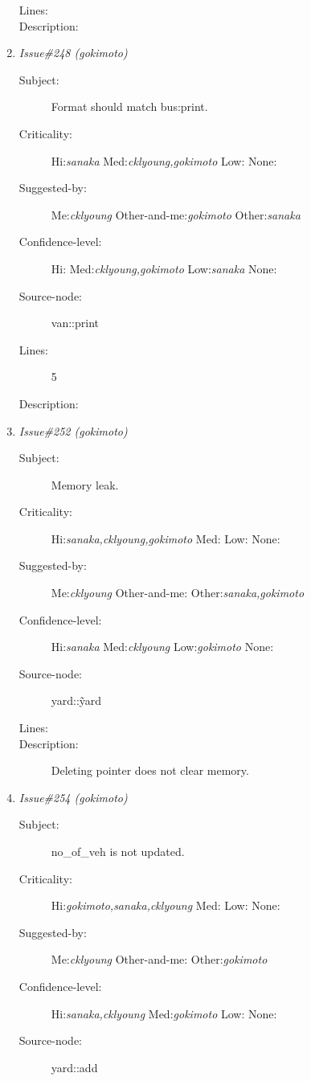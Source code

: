 \begin{enumerate}
\begin{description}
\item [Lines:] 

\item [Description:] 
\end{description}
\item {\it Issue\#248 (gokimoto)}
\begin{description}
\item [Subject:] Format should match bus:print.
\item [Criticality:] Hi:{\it sanaka} Med:{\it cklyoung,gokimoto} Low:{\it } None:{\it }
\item [Suggested-by:] Me:{\it cklyoung} Other-and-me:{\it gokimoto} Other:{\it sanaka}
\item [Confidence-level:] Hi:{\it } Med:{\it cklyoung,gokimoto} Low:{\it sanaka} None:{\it }
\item [Source-node:] van::print

\item [Lines:] 5

\item [Description:] 
\end{description}
\item {\it Issue\#252 (gokimoto)}
\begin{description}
\item [Subject:] Memory leak.
\item [Criticality:] Hi:{\it sanaka,cklyoung,gokimoto} Med:{\it } Low:{\it } None:{\it }
\item [Suggested-by:] Me:{\it cklyoung} Other-and-me:{\it } Other:{\it sanaka,gokimoto}
\item [Confidence-level:] Hi:{\it sanaka} Med:{\it cklyoung} Low:{\it gokimoto} None:{\it }
\item [Source-node:] yard::\~yard

\item [Lines:] 

\item [Description:] Deleting pointer does not clear memory.
\end{description}
\item {\it Issue\#254 (gokimoto)}
\begin{description}
\item [Subject:] no\_of\_veh is not updated.
\item [Criticality:] Hi:{\it gokimoto,sanaka,cklyoung} Med:{\it } Low:{\it } None:{\it }
\item [Suggested-by:] Me:{\it cklyoung} Other-and-me:{\it } Other:{\it gokimoto}
\item [Confidence-level:] Hi:{\it sanaka,cklyoung} Med:{\it gokimoto} Low:{\it } None:{\it }
\item [Source-node:] yard::add


\end{description}
\end{enumerate}

